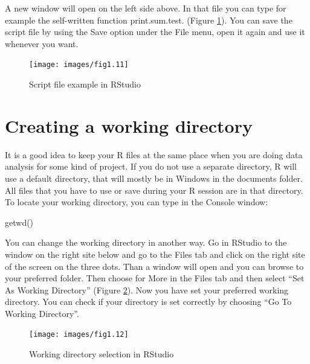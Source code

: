 \documentclass[
]{book}
\newenvironment{Shaded}{\begin{snugshade}}{\end{snugshade}}
\newcommand{\FunctionTok}[1]{\textcolor[rgb]{0.00,0.00,0.00}{#1}}
\newcommand{\NormalTok}[1]{#1}
\begin{document}
A new window will open on the left side above. In that file you can type for example the self-written function print.sum.test. (Figure \ref{fig:fig11}). You can save the script file by using the Save option under the File menu, open it again and use it whenever you want.

\begin{figure}

{\centering \texttt{[image: images/fig1.11]} 

}

\caption{Script file example in RStudio}\label{fig:fig11}
\end{figure}

\hypertarget{creating-a-working-directory}{%
\section{Creating a working directory}\label{creating-a-working-directory}}

It is a good idea to keep your R files at the same place when you are doing data analysis for some kind of project. If you do not use a separate directory, R will use a default directory, that will mostly be in Windows in the documents folder. All files that you have to use or save during your R session are in that directory. To locate your working directory, you can type in the Console window:

\begin{Shaded}
\begin{Highlighting}[]
\FunctionTok{getwd}\NormalTok{()}
\end{Highlighting}
\end{Shaded}

You can change the working directory in another way. Go in RStudio to the window on the right site below and go to the Files tab and click on the right site of the screen on the three dots. Than a window will open and you can browse to your preferred folder. Then choose for More in the Files tab and then select ``Set As Working Directory'' (Figure \ref{fig:fig12}). Now you have set your preferred working directory. You can check if your directory is set correctly by choosing ``Go To Working Directory''.

\begin{figure}

{\centering \texttt{[image: images/fig1.12]} 

}

\caption{Working directory selection in RStudio}\label{fig:fig12}
\end{figure}
\end{document}

